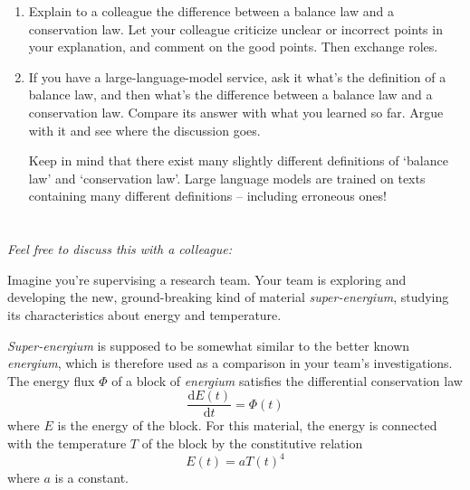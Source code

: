\documentclass[a4paper,12pt,%
onecolumn,oneside,%
british%
]{memoir}
\newcommand*{\di}{\mathrm{d}}%
\renewcommand*{\|}[1][]{\nonscript\:#1\vert\nonscript\:\mathopen{}}
\newcommand*{\yE}{E}
\newcommand*{\yH}{\varPhi}%
\newcommand*{\yT}{T}%
\begin{document}
\smallskip

\begin{enumerate}[exerc]
\item Explain to a colleague the difference between a balance law and a conservation law. Let your colleague criticize unclear or incorrect points in your explanation, and comment on the good points. Then exchange roles.
\item If you have a large-language-model service, ask it what's the definition of a balance law, and then what's the difference between a balance law and a conservation law. Compare its answer with what you learned so far. Argue with it and see where the discussion goes.\nopagebreak

  Keep in mind that there exist many slightly different definitions of \enquote*{balance law} and \enquote*{conservation law}.  Large language models are trained on texts containing many different definitions -- including erroneous ones!
\end{enumerate}








\section{}
\label{sec:change_bal_or_const}

\emph{Feel free to discuss this with a colleague:}

\smallskip

Imagine you're supervising a research team. Your team is exploring and developing the new, ground-breaking kind of material \emph{super-energium}, studying its characteristics about energy and temperature.

\emph{Super-energium} is supposed to be somewhat similar to the better known \emph{energium}, which is therefore used as a comparison in your team's investigations. The energy flux $\yH$ of a block of \emph{energium} satisfies the differential conservation law
\begin{equation}\label{eq:energy_block}
  \frac{\di\yE(t)}{\di t} = \yH(t)
\end{equation}
where $\yE$ is the energy of the block. For this material, the energy is connected with the temperature $\yT$ of the block by the constitutive relation
\begin{equation}\label{eq:const_block}
  \yE(t) = a \yT(t)^{4}
\end{equation}
where $a$ is a constant.
\end{document}
